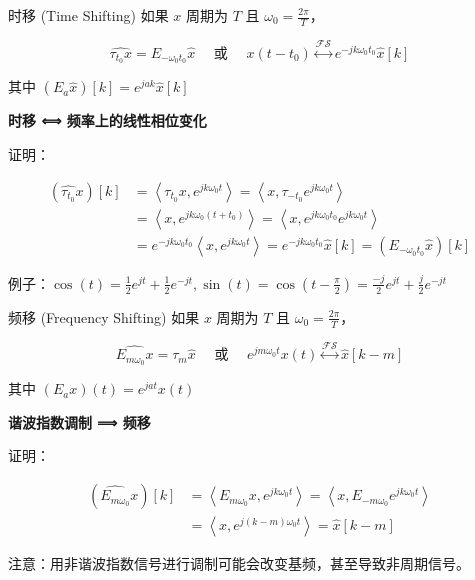\documentclass[
  ignorenonframetext,
]{beamer}
\begin{document}
\begin{frame}{时移 (Time Shifting)}
\protect{}\label{ux65f6ux79fb-time-shifting}
如果 \(x\) 周期为 \(T\) 且 \(\omega_{0}=\frac{2 \pi}{T}\)，

\[
\widehat{\tau_{t_{0}} x}=E_{-\omega_{0} t_{0}} \hat{x} \quad \text { 或 } \quad x\left(t-t_{0}\right) \stackrel{\mathcal{F S}}{\longleftrightarrow} e^{-j k \omega_{0} t_{0}} \hat{x}[k]
\]

其中 \(\left(E_{a} \hat{x}\right)[k]=e^{j a k} \hat{x}[k]\)

\textbf{时移 ⟺ 频率上的线性相位变化}

证明：

\[
\begin{aligned}
\left(\widehat{\tau_{t_{0}}} x\right)[k] & =\left\langle\tau_{t_{0}} x, e^{j k \omega_{0} t}\right\rangle=\left\langle x, \tau_{-t_{0}} e^{j k \omega_{0} t}\right\rangle \\
& =\left\langle x, e^{j k \omega_{0}\left(t+t_{0}\right)}\right\rangle=\left\langle x, e^{j k \omega_{0} t_{0}} e^{j k \omega_{0} t}\right\rangle \\
& =e^{-j k \omega_{0} t_{0}}\left\langle x, e^{j k \omega_{0} t}\right\rangle=e^{-j k \omega_{0} t_{0}} \hat{x}[k]=\left(E_{-\omega_{0} t_{0}} \hat{x}\right)[k]
\end{aligned}
\]

例子：\(\cos (t)=\frac{1}{2} e^{j t}+\frac{1}{2} e^{-j t}, \sin (t)=\cos \left(t-\frac{\pi}{2}\right)=\frac{-j}{2} e^{j t}+\frac{j}{2} e^{-j t}\)
\end{frame}

\begin{frame}{频移 (Frequency Shifting)}
\protect{}\label{ux9891ux79fb-frequency-shifting}
如果 \(x\) 周期为 \(T\) 且 \(\omega_{0}=\frac{2 \pi}{T}\)，

\[
\widehat{E_{m \omega_{0}} x}=\tau_{m} \hat{x} \quad \text { 或 } \quad e^{j m \omega_{0} t} x(t) \stackrel{\mathcal{F S}}{\longleftrightarrow} \hat{x}[k-m]
\]

其中 \(\left(E_{a} x\right)(t)=e^{j a t} x(t)\)

\textbf{谐波指数调制 ⟹ 频移}

证明：

\[
\begin{aligned}
\left(\widehat{E_{m \omega_{0}}} x\right)[k] & =\left\langle E_{m \omega_{0}} x, e^{j k \omega_{0} t}\right\rangle=\left\langle x, E_{-m \omega_{0}} e^{j k \omega_{0} t}\right\rangle \\
& =\left\langle x, e^{j(k-m) \omega_{0} t}\right\rangle=\hat{x}[k-m]
\end{aligned}
\]

注意：用非谐波指数信号进行调制可能会改变基频，甚至导致非周期信号。
\end{frame}
\end{document}
